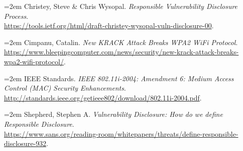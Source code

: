 \documentclass[12pt]{article}
\begin{document}
\noindent \hangindent=2em
Christey, Steve \& Chris Wysopal.
\textit{Responsible Vulnerability Disclosure Process}. \\
\url{https://tools.ietf.org/html/draft-christey-wysopal-vuln-disclosure-00}.

\noindent \hangindent=2em
Cimpanu, Catalin.
\textit{New KRACK Attack Breaks WPA2 WiFi Protocol}. \\
\url{https://www.bleepingcomputer.com/news/security/new-krack-attack-breaks-wpa2-wifi-protocol/}.

\noindent \hangindent=2em
IEEE Standards.
\textit{IEEE 802.11i-2004: Amendment 6: Medium Access Control (MAC) Security Enhancements}.
\url{http://standards.ieee.org/getieee802/download/802.11i-2004.pdf}.

\noindent \hangindent=2em
Shepherd, Stephen A.
\textit{Vulnerability Disclosure: How do we define Responsible Disclosure}. \\
\url{https://www.sans.org/reading-room/whitepapers/threats/define-responsible-disclosure-932}.

\end{document}

